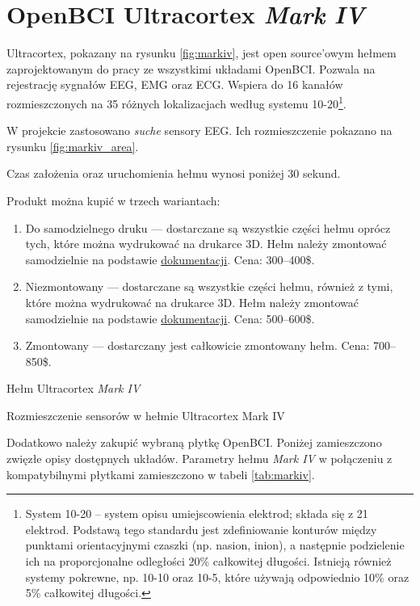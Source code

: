 \documentclass[skorowidz,skroty]{dyplomWEZUT}
\begin{document}
\section{OpenBCI Ultracortex \textit{Mark IV}}
Ultracortex, pokazany na rysunku \vref{fig:markiv}, jest open source'owym hełmem zaprojektowanym do pracy ze wszystkimi układami OpenBCI\cite{markiv_shop}. Pozwala na rejestrację sygnałów EEG, EMG oraz ECG. Wspiera do 16 kanałów rozmieszczonych na 35 różnych lokalizacjach według systemu 10-20\footnote{System 10-20 -- system opisu umiejscowienia elektrod; składa się z 21 elektrod. Podstawą tego standardu jest zdefiniowanie konturów między punktami orientacyjnymi czaszki (np. nasion, inion), a następnie podzielenie ich na proporcjonalne odległości 20\% całkowitej długości. Istnieją również systemy pokrewne, np. 10-10 oraz 10-5, które używają odpowiednio 10\% oraz 5\% całkowitej długości\cite[rozdz. 6]{bci_principles}.}.

W projekcie zastosowano \textit{suche} sensory EEG. Ich rozmieszczenie pokazano na rysunku \vref{fig:markiv_area}.

Czas założenia oraz uruchomienia hełmu wynosi poniżej 30 sekund.

Produkt można kupić w trzech wariantach:
\begin{enumerate}
    \item Do samodzielnego druku --- dostarczane są wszystkie części hełmu oprócz tych, które można wydrukować na drukarce 3D. Hełm należy zmontować samodzielnie na podstawie \href{https://docs.openbci.com/Headware/01-Ultracortex-Mark-IV#ultracortex-mark-iv-assembly-instructions}{dokumentacji}. Cena: 300--400\$.
    \item Niezmontowany --- dostarczane są wszystkie części hełmu, również z tymi, które można wydrukować na drukarce 3D. Hełm należy zmontować samodzielnie na podstawie \href{https://docs.openbci.com/Headware/01-Ultracortex-Mark-IV#ultracortex-mark-iv-assembly-instructions}{dokumentacji}. Cena: 500--600\$.
    \item Zmontowany --- dostarczany jest całkowicie zmontowany hełm. Cena: 700--850\$.
\end{enumerate}

{Hełm Ultracortex \textit{Mark IV}\label{fig:markiv}}
{\cite{markiv}}

{Rozmieszczenie sensorów w hełmie Ultracortex Mark IV\label{fig:markiv_area}}
{\cite{markiv_shop}}

Dodatkowo należy zakupić wybraną płytkę OpenBCI. Poniżej zamieszczono zwięzłe opisy dostępnych układów. Parametry hełmu \textit{Mark IV} w połączeniu z kompatybilnymi płytkami zamieszczono w tabeli \vref{tab:markiv}.
\end{document}
